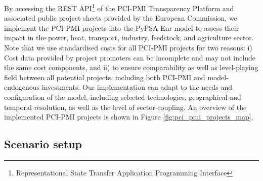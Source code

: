 \documentclass[final,5p,times,twocolumn]{elsarticle}
\let\autocite\cite
\begin{document}
By accessing the REST API\footnote{Representational State Transfer Application Programming Interface} of the PCI-PMI Transparency Platform \autocite{europeancommissionPCIPMITransparencyPlatform2024} and associated public project sheets provided by the European Commission, we implement the PCI-PMI projects into the PyPSA-Eur model to assess their impact in the power, heat, transport, industry, feedstock, and agriculture sector. Note that we use standardised costs for all PCI-PMI projects \autocite{zeyenPyPSATechnologydataV0922024} for two reasons: i) Cost data provided by project promoters can be incomplete and may not include the same cost components, and ii) to ensure comparability as well as level-playing field between all potential projects, including both PCI-PMI and model-endogenous investments.
Our implementation can adapt to the needs and configuration of the model, including selected technologies, geographical and temporal resolution, as well as the level of sector-coupling. An overview of the implemented PCI-PMI projects is shown in Figure \ref{fig:pci_pmi_projects_map}.



\subsection{Scenario setup}
\label{sec:scenario_setup}
\end{document}
